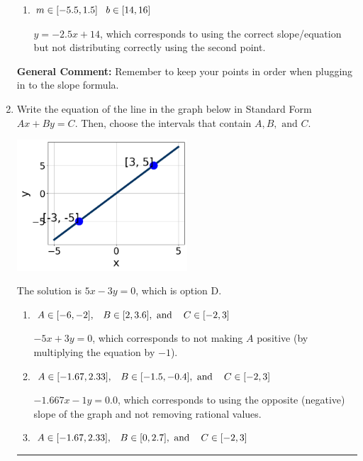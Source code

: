 \documentclass{extbook}[14pt]
\newcommand{\litem}[1]{\item #1

\rule{\textwidth}{0.4pt}}
\begin{document}
\begin{enumerate}
{\begin{enumerate}[label=\Alph*.]
 $y = 2.5x + 18.5$, which corresponds to using the negative slope and the correct equation.
\item \( m \in [-5.5, 1.5] \hspace*{3mm} b \in [14, 16] \)

 $y = -2.5x + 14$, which corresponds to using the correct slope/equation but not distributing correctly using the second point.
\end{enumerate}

\textbf{General Comment:} Remember to keep your points in order when plugging in to the slope formula.
}
\litem{
Write the equation of the line in the graph below in Standard Form $Ax+By=C$. Then, choose the intervals that contain $A, B, \text{ and } C$.

\begin{center}
    \includegraphics[width=0.5\textwidth]{../Figures/linearGraphToStandardCopyB.png}
\end{center}


The solution is \( 5x - 3y = 0 \), which is option D.\begin{enumerate}[label=\Alph*.]
\item \( A \in [-6, -2], \hspace{3mm} B \in [2, 3.6], \text{ and } \hspace{3mm} C \in [-2, 3] \)

 $-5x + 3y = 0$, which corresponds to not making $A$ positive (by multiplying the equation by $-1$).
\item \( A \in [-1.67, 2.33], \hspace{3mm} B \in [-1.5, -0.4], \text{ and } \hspace{3mm} C \in [-2, 3] \)

 $-1.667x - 1y = 0.0$, which corresponds to using the opposite (negative) slope of the graph and not removing rational values.
\item \( A \in [-1.67, 2.33], \hspace{3mm} B \in [0, 2.7], \text{ and } \hspace{3mm} C \in [-2, 3] \)


\end{enumerate}}
\end{enumerate}
\end{document}
